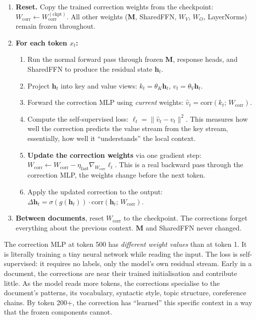\documentclass[11pt, a4paper]{article}
\newcommand{\M}{\mathbf{M}}
\theoremstyle{plain}
\theoremstyle{definition}
\theoremstyle{remark}
\begin{document}
\begin{enumerate}[nosep]
\item \textbf{Reset.} Copy the trained correction weights from the checkpoint: $W_{\mathrm{corr}} \leftarrow W_{\mathrm{corr}}^{(\mathrm{ckpt})}$.
      All other weights ($\M$, SharedFFN, $W_V$, $W_O$, LayerNorms) remain frozen throughout.

\item \textbf{For each token $x_t$:}
\begin{enumerate}[nosep, label=(\alph*)]
\item Run the normal forward pass through frozen $\M$, response heads, and SharedFFN to produce the residual state $\mathbf{h}_t$.
\item Project $\mathbf{h}_t$ into key and value views: $k_t = \theta_K \mathbf{h}_t$, $v_t = \theta_V \mathbf{h}_t$.
\item Forward the correction MLP using \emph{current} weights: $\hat{v}_t = \mathrm{corr}(k_t;\, W_{\mathrm{corr}})$.
\item Compute the self-supervised loss: $\ell_t = \|\hat{v}_t - v_t\|^2$.
      This measures how well the correction predicts the value stream from the key stream, essentially, how well it ``understands'' the local context.
\item \textbf{Update the correction weights} via one gradient step:
      $W_{\mathrm{corr}} \leftarrow W_{\mathrm{corr}} - \eta_{\mathrm{fast}} \nabla_{W_{\mathrm{corr}}} \ell_t$.
      This is a real backward pass through the correction MLP, the weights change before the next token.
\item Apply the updated correction to the output: $\Delta\mathbf{h}_t = \sigma(g(\mathbf{h}_t)) \cdot \mathrm{corr}(\mathbf{h}_t;\, W_{\mathrm{corr}})$.
\end{enumerate}

\item \textbf{Between documents}, reset $W_{\mathrm{corr}}$ to the checkpoint.
      The corrections forget everything about the previous context.
      $\M$ and SharedFFN never changed.
\end{enumerate}

The correction MLP at token 500 has \emph{different weight values} than at token 1.
It is literally training a tiny neural network while reading the input.
The loss is self-supervised: it requires no labels, only the model's own residual stream.
Early in a document, the corrections are near their trained initialisation and contribute little.
As the model reads more tokens, the corrections specialise to the document's patterns, its vocabulary, syntactic style, topic structure, coreference chains.
By token 200+, the correction has ``learned'' this specific context in a way that the frozen components cannot.
\end{document}
